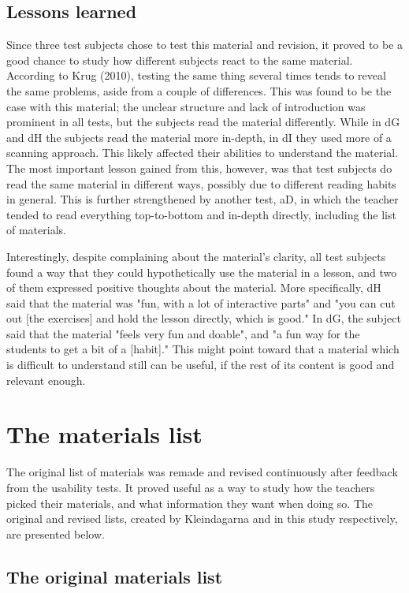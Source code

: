 \subsection{Lessons learned}

Since three test subjects chose to test this material and revision, it proved to be a good chance to study how different subjects react to the same material. According to Krug (2010), testing the same thing several times tends to reveal the same problems, aside from a couple of differences. This was found to be the case with this material; the unclear structure and lack of introduction was prominent in all tests, but the subjects read the material differently. While in dG and dH the subjects read the material more in-depth, in dI they used more of a scanning approach. This likely affected their abilities to understand the material. The most important lesson gained from this, however, was that test subjects do read the same material in different ways, possibly due to different reading habits in general. This is further strengthened by another test, aD, in which the teacher tended to read everything top-to-bottom and in-depth directly, including the list of materials.

Interestingly, despite complaining about the material's clarity, all test subjects found a way that they could hypothetically use the material in a lesson, and two of them expressed positive thoughts about the material. More specifically, dH said that the material was "fun, with a lot of interactive parts" and "you can cut out [the exercises] and hold the lesson directly, which is good." In dG, the subject said that the material "feels very fun and doable", and "a fun way for the students to get a bit of a [habit]." This might point toward that a material which is difficult to understand still can be useful, if the rest of its content is good and relevant enough.

\section{The materials list}

The original list of materials was remade and revised continuously after feedback from the usability tests. It proved useful as a way to study how the teachers picked their materials, and what information they want when doing so. The original and revised lists, created by Kleindagarna and in this study respectively, are presented below.

\subsection{The original materials list}

